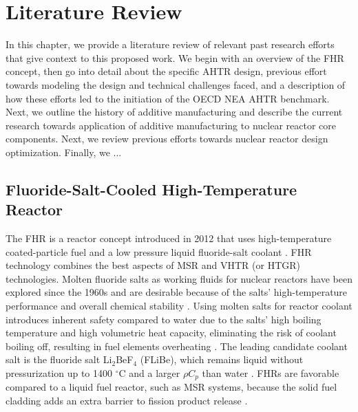 \chapter{Literature Review}

In this chapter, we provide a literature review of relevant past research 
efforts that give context to this proposed work. 
We begin with an overview of the \gls{FHR} concept, then go into detail about 
the specific \gls{AHTR} design, previous effort towards modeling the design and 
technical challenges faced, and a description of how these efforts led to the 
initiation of the \gls{OECD} \gls{NEA} \gls{AHTR} benchmark.  
Next, we outline the history of additive manufacturing and describe the current 
research towards application of additive manufacturing to nuclear reactor core 
components. 
Next, we review previous efforts towards nuclear reactor design optimization. 
Finally, we ...

\section{Fluoride-Salt-Cooled High-Temperature Reactor}
The \gls{FHR} is a reactor concept introduced in 2012 that uses high-temperature 
coated-particle fuel and a low pressure liquid fluoride-salt coolant 
\cite{forsberg_fluoride-salt-cooled_2012,facilitators_fluoride-salt-cooled_2013}.
\gls{FHR} technology combines the best aspects of \gls{MSR} and \gls{VHTR} 
(or \gls{HTGR}) technologies. 
Molten fluoride salts as working fluids for nuclear reactors have been explored 
since the 1960s and are desirable because of the salts' high-temperature 
performance and overall chemical stability \cite{scarlat_design_2014}.  
Using molten salts for reactor coolant introduces inherent safety compared 
to water due to the salts' high boiling temperature and high volumetric 
heat capacity, eliminating the risk of coolant boiling off, resulting in 
fuel elements overheating \cite{ho_molten_2013}. 
The leading candidate coolant salt is the fluoride salt Li$_2$BeF$_4$ (FLiBe), 
which remains liquid without pressurization up to 1400 $^{\circ}$C and a larger 
$\rho C_p$ than water \cite{ho_molten_2013,forsberg_fluoride-salt-cooled_2012}. 
\glspl{FHR} are favorable compared to a liquid fuel reactor, such as
\gls{MSR} systems, because the solid fuel cladding adds an extra barrier to fission 
product release 
\cite{ho_molten_2013}.

